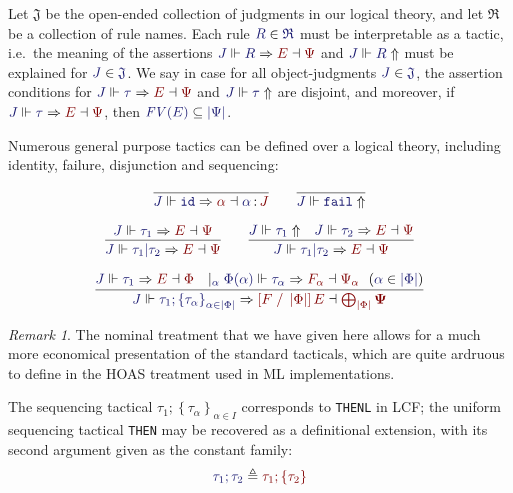 \documentclass[11pt]{article}
\theoremstyle{definition}
\theoremstyle{remark}
\newtheorem{remark}[thm]{Remark}
\numberwithin{equation}{section}
\def\InputModeColorName{MidnightBlue}
\def\OutputModeColorName{Maroon}
\newcommand\InputMode[1]{{\color{\InputModeColorName}{#1}}}
\newcommand\OutputMode[1]{{\color{\OutputModeColorName}{#1}}}
\newcommand\HypJ[2]{#1\ \ (#2)}
\newcommand\GenJ[2]{\vert_{\InputMode{#1}}\; #2}
\newcommand\JJ{J}
\newcommand\RSet{\mathfrak{R}}
\newcommand\JSet{\mathfrak{J}}
\newcommand\IsTac[1]{\InputMode{#1}\ \textit{tactic}}
\newcommand\MkSet[1]{\left\{#1\right\}}
\newcommand\MkFam[3]{\MkSet{#1_{#2}}_{#2\in #3}}
\newcommand\OSG[2]{\InputMode{#1}\,{\color{Black}:}\,\OutputMode{#2}}
\newcommand\Refine[4]{\InputMode{#1}\Vdash\InputMode{#2}\Rightarrow\OutputMode{#4}\dashv\OutputMode{#3}}
\newcommand\NoRefine[2]{\InputMode{#1}\Vdash\InputMode{#2}\Uparrow}
\newcommand\Member[2]{\InputMode{#1}\in\InputMode{#2}}
\newcommand\IdTac{\mathtt{id}}
\newcommand\FailTac{\mathtt{fail}}
\newcommand\OrElseTac[2]{#1\vert#2}
\newcommand\ThenTac[2]{#1;#2}
\newcommand\Dom[1]{\left\vert#1\right\vert}
\newcommand\SubsetEq[2]{\InputMode{#1}\subseteq\InputMode{#2}}
\newcommand\FV[1]{\textit{FV}\left(#1\right)}
\newcommand\Subst[3]{\left[#1\;/\;#2\right]#3}
\begin{document}
Let $\JSet$ be the open-ended collection of judgments in our logical theory,
and let $\RSet$ be a collection of rule names. Each rule $\Member{R}{\RSet}$
must be interpretable as a tactic, i.e.\ the meaning of the assertions
$\Refine{\JJ}{R}{\Psi}{E}$ and $\NoRefine{\JJ}{R}$ must be explained for
$\Member{J}{\JSet}$. We say \framebox{$\IsTac{\tau}$} in case for all object-judgments
$\Member{\JJ}{\JSet}$, the assertion conditions for
$\Refine{\JJ}{\tau}{\Psi}{E}$ and $\NoRefine{\JJ}{\tau}$ are disjoint, and
moreover, if $\Refine{\JJ}{\tau}{\Psi}{E}$, then
$\SubsetEq{\FV{E}}{\Dom{\Psi}}$.

Numerous general purpose tactics can be defined over a logical theory,
including identity, failure, disjunction and sequencing:

\begin{gather*}
  \infer{
    \Refine{\JJ}{\IdTac}{\OSG{\alpha}{\JJ}}{\alpha}
  }{
  }
  \qquad
  \infer{
    \NoRefine{\JJ}{\FailTac}
  }{
  }\\[6pt]
  \infer{
    \Refine{\JJ}{\OrElseTac{\tau_1}{\tau_2}}{\Psi}{E}
  }{
    \Refine{\JJ}{\tau_1}{\Psi}{E}
  }
  \qquad
  \infer{
    \Refine{\JJ}{\OrElseTac{\tau_1}{\tau_2}}{\Psi}{E}
  }{
    \NoRefine{\JJ}{\tau_1} &
    \Refine{\JJ}{\tau_2}{\Psi}{E}
  }\\[6pt]
  \infer{
    \Refine{\JJ}{\ThenTac{\tau_1}{\MkFam{\tau}{\alpha}{\Dom\Phi}}}{\bigoplus_{\Dom\Phi}\mathbf\Psi}{\Subst{F}{\Dom\Phi}{E}}
  }{
    \Refine{\JJ}{\tau_1}{\Phi}{E} &
    \GenJ{\alpha}{
      \HypJ{
        \Refine{\Phi(\alpha)}{\tau_\alpha}{\Psi_\alpha}{F_\alpha}
      }{
        \Member{\alpha}{\Dom\Phi}
      }
    }
  }
\end{gather*}

\begin{remark}
  The nominal treatment that we have given here allows for a much more
  economical presentation of the standard tacticals, which are quite ardruous
  to define in the HOAS treatment used in ML implementations.
\end{remark}

The sequencing tactical
$\ThenTac{\tau_1}{\MkFam{\tau}{\alpha}{I}}$ corresponds to
\verb!THENL! in LCF; the uniform sequencing tactical \verb!THEN! may be
recovered as a definitional extension, with its second argument given as the
constant family:
\[
    \InputMode{\ThenTac{\tau_1}{\tau_2}}
    \triangleq
    \OutputMode{\ThenTac{\tau_1}{\MkSet{\tau_2}}}
\]
\end{document}
